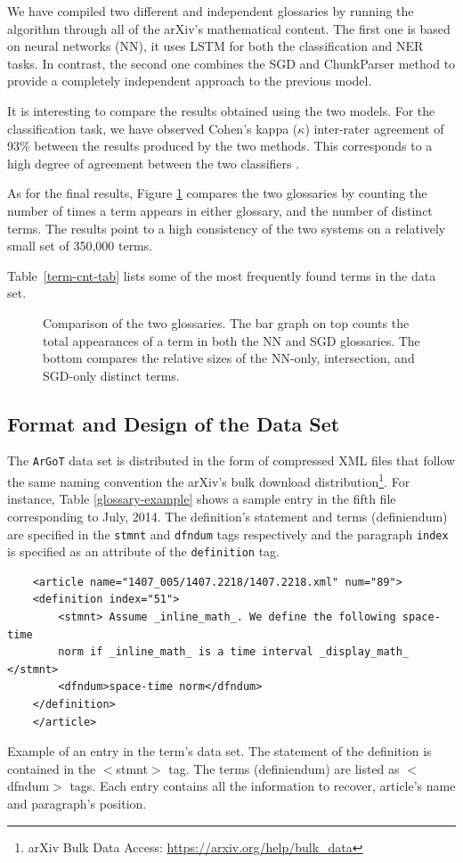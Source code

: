 \documentclass[submission,copyright,creativecommons]{eptcs}
\newcommand{\argot}{\texttt{ArGoT}\xspace}
\begin{document}
We have compiled two different and independent glossaries by running the 
algorithm through all of the arXiv's mathematical content. 
The first one  is based on neural networks (NN), it uses  LSTM for both the classification and NER tasks. 
In contrast, the second one combines the SGD and ChunkParser method to provide a completely independent approach to the previous model.

It is interesting to compare the results obtained using the two models. For the classification task, we have observed Cohen's kappa ($\kappa$) inter-rater agreement of 93\% between the results produced by the two methods.
This corresponds to a high degree of agreement between the two classifiers \cite{cohenkappa}.

As for the final results, Figure \ref{sizes} compares the two glossaries by counting the number of times a term appears in either glossary, and the number of distinct terms.
The results point to a high consistency of the two systems on a relatively small set of 350,000 terms.

Table~\ref{term-cnt-tab} lists some of the most frequently found terms in the
data set. 
\begin{figure}
    \centering
    
    \caption{\label{sizes} Comparison of the two glossaries. The bar graph on top counts the total appearances of a term in both the NN and SGD glossaries. The bottom compares the relative sizes of the NN-only, intersection, and SGD-only distinct terms.}
\end{figure}

\subsection{Format and Design of the Data Set}
The \argot data set is distributed in the form of compressed
XML
files that follow the same naming convention the arXiv's bulk download
distribution\footnote{arXiv Bulk Data Access: \url{https://arxiv.org/help/bulk\_data}}.
For instance, Table \ref{glossary-example} shows a sample entry
in the fifth file corresponding to July, 2014. The definition's
statement and terms (definiendum) are specified in the \texttt{stmnt} and
\texttt{dfndum} tags respectively and the paragraph \texttt{index} is
specified as an attribute of the \texttt{definition} tag.

\begin{table}[h]
    \centering
    \begin{verbatim}
    <article name="1407_005/1407.2218/1407.2218.xml" num="89">
    <definition index="51">
        <stmnt> Assume _inline_math_. We define the following space-time 
        norm if _inline_math_ is a time interval _display_math_ </stmnt>
        <dfndum>space-time norm</dfndum>
    </definition>
    </article>
\end{verbatim}
\caption{\label{glossary-example} Example of an entry in the term's data set. The statement of the definition is contained in the $<$stmnt$>$ tag. The terms (definiendum) are listed as $<$dfndum$>$ tags. Each entry contains all the information to recover, article's name and paragraph's position.}
\end{table}
\end{document}
